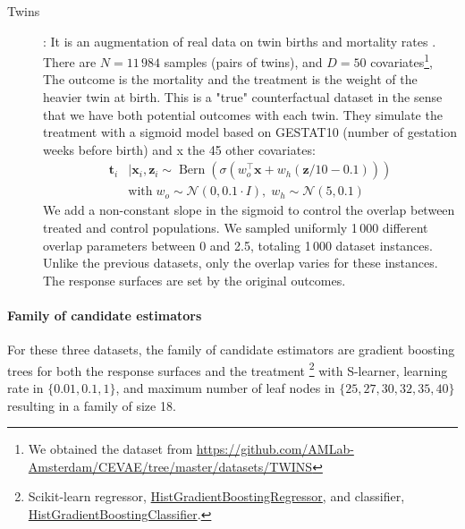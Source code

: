 \documentclass{report}
\begin{document}
\begin{description}
  \item[Twins] \citep{louizos_causal_2017}: It is an augmentation of
    real data on twin births and mortality rates
    \citep{almond_costs_2005}. There are $N=11\,984$ samples (pairs of twins),
    and $D=50$ covariates\footnote{We obtained the dataset from
      \href{https://github.com/AMLab-Amsterdam/CEVAE/tree/master/datasets/TWINS}{https://github.com/AMLab-Amsterdam/CEVAE/tree/master/datasets/TWINS}}, The outcome is the mortality and the treatment is the
    weight of the heavier twin at birth. This is a "true" counterfactual dataset
    \citep{curth_really_2021} in the sense that we have
    both potential outcomes with each twin. They simulate the treatment with a
    sigmoid model based on GESTAT10 (number of gestation weeks before birth) and x
    the 45 other covariates:
    \begin{align}
      \mathbf{t}_{i} & \mid \mathbf{x}_{i}, \mathbf{z}_{i} \sim
      \operatorname{Bern}\left(\sigma\left(w_{o}^{\top}
      \mathbf{x}+w_{h}(\mathbf{z} / 10-0.1)\right)\right)       \\ & \text{with} \;
      w_{o} \sim \mathcal{N}(0,0.1 \cdot I),\; w_{h} \sim \mathcal{N}(5,0.1) \nonumber
    \end{align}
    We add a non-constant slope in the
    sigmoid to control the overlap between
    treated and control populations.
    We sampled uniformly 1\,000 different overlap parameters between 0 and
    2.5, totaling 1\,000 dataset instances. Unlike the previous datasets,
    only the overlap varies for these instances. The response surfaces are
    set by the original outcomes.
\end{description}

\paragraph{Family of candidate estimators}

For these three datasets, the family of candidate estimators are gradient
boosting trees for both the response surfaces and the treatment
\footnote{Scikit-learn regressor,
  \href{https://scikit-learn.org/stable/modules/generated/sklearn.ensemble.HistGradientBoostingRegressor.html}{HistGradientBoostingRegressor},
  and classifier,
  \href{https://scikit-learn.org/stable/modules/generated/sklearn.ensemble.HistGradientBoostingClassifier.html}{HistGradientBoostingClassifier}.}
with S-learner, learning rate
in $\{0.01, 0.1, 1\}$, and maximum number of leaf nodes in $\{25, 27, 30, 32,
  35, 40\}$ resulting in a family of size 18.
\end{document}
